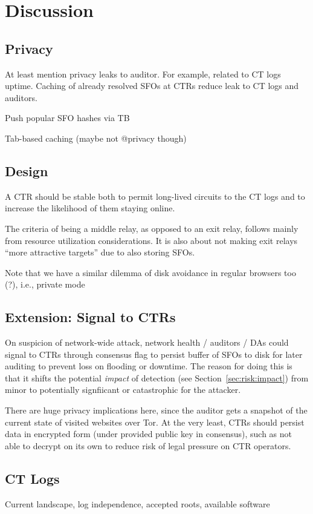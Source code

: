\section{Discussion} \label{sec:discussion}

\subsection{Privacy}
At least mention privacy leaks to auditor. For example, related to CT logs
uptime. Caching of already resolved SFOs at CTRs reduce leak to CT logs and
auditors.

Push popular SFO hashes via TB

Tab-based caching (maybe not @privacy though)

\subsection{Design}
A CTR should be stable both to permit long-lived circuits to the CT logs and
to increase the likelihood of them staying online.

The criteria of being a middle relay, as opposed to an exit relay, follows
mainly from resource utilization considerations.  It is also about not making
exit relays ``more attractive targets'' due to also storing SFOs.

Note that we have a similar dilemma of disk avoidance in regular browsers too
(?), i.e., private mode

\subsection{Extension: Signal to CTRs}
On suspicion of network-wide attack, network health / auditors / DAs could
signal to CTRs through consensus flag to persist buffer of SFOs to disk for
later auditing to prevent loss on flooding or downtime. The reason for doing
this is that it shifts the potential \emph{impact} of detection (see
Section~\ref{sec:risk:impact}) from minor to potentially signfiicant or
catastrophic for the attacker.

There are huge privacy implications here, since the auditor gets a snapshot of
the current state of visited websites over Tor. At the very least, CTRs should
persist data in encrypted form (under provided public key in consensus), such as
not able to decrypt on its own to reduce risk of legal pressure on CTR
operators.

\subsection{CT Logs} \label{sec:discussion:logs}
Current landscape, log independence, accepted roots, available software

